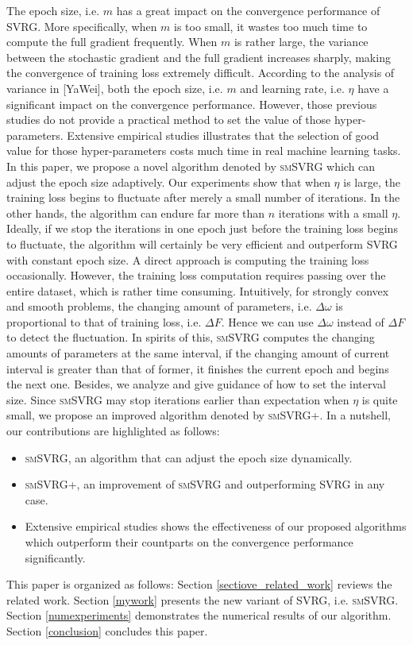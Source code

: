 \documentclass[conference]{IEEEtran}
\begin{document}
The epoch size, i.e. $m$ has a great impact on the convergence performance of SVRG. More specifically, when $m$ is too small, it wastes too much time to compute the full gradient frequently. When $m$ is rather large, the variance between the stochastic gradient and the full gradient increases sharply, making the convergence of training loss extremely difficult. According to the analysis of variance in [YaWei], both the epoch size, i.e. $m$ and learning rate, i.e. $\eta$ have a significant impact on the convergence performance.  However, those previous studies do not provide a practical method to set the value of those hyper-parameters. Extensive empirical studies illustrates that the selection of good value for those hyper-parameters costs much time in real machine learning tasks.  
In this paper, we propose a novel algorithm denoted by \textsc{smSVRG} which can adjust the epoch size adaptively.  Our experiments show that when $\eta$ is large, the training loss begins to fluctuate after merely a small number of iterations. In the other hands, the algorithm can endure far more than $n$ iterations with a small $\eta$. Ideally, if we stop the iterations in one epoch just before the training loss begins to fluctuate, the algorithm will certainly be very efficient and outperform SVRG with constant epoch size. A direct approach is computing the training loss occasionally. However, the training loss computation requires passing over the entire dataset, which is rather time consuming. Intuitively, for strongly convex and smooth problems, the changing amount of parameters, i.e. $\Delta\omega$ is proportional to that of training loss, i.e. $\Delta F$. Hence we can use $\Delta\omega$ instead of $\Delta F$ to detect the fluctuation.  In spirits of this, \textsc{smSVRG} computes the changing amounts of parameters at the same interval, if the changing amount of current interval is greater than that of former, it finishes the current epoch and begins the next one. Besides, we analyze and give guidance of how to set the interval size. Since \textsc{smSVRG} may stop iterations earlier than expectation when $\eta$ is quite small, we propose an improved algorithm denoted by \textsc{smSVRG+}. In a nutshell, our contributions are highlighted as follows:
\begin {itemize}
\item \textsc{smSVRG}, an algorithm that can adjust the epoch size dynamically.
\item \textsc{smSVRG+}, an improvement of \textsc{smSVRG} and outperforming SVRG in any case.
\item Extensive empirical studies shows the effectiveness of our proposed algorithms which outperform their countparts on the convergence performance significantly.
\end {itemize}
This paper is organized as follows: Section \ref{sectiove_related_work} reviews the related work. Section \ref{mywork} presents the new variant of SVRG, i.e. \textsc{smSVRG}. Section \ref{numexperiments} demonstrates the numerical results of our algorithm. Section \ref{conclusion} concludes this paper.
\end{document}
